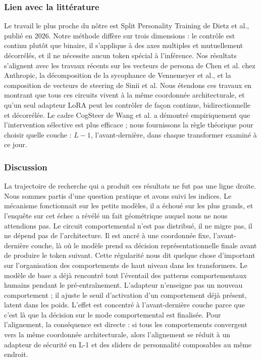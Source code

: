 \documentclass[11pt,a4paper]{article}
\begin{document}
\subsubsection{Lien avec la littérature}

Le travail le plus proche du nôtre est Split Personality Training de Dietz et al., publié en 2026. Notre méthode diffère sur trois dimensions : le contrôle est continu plutôt que binaire, il s'applique à des axes multiples et mutuellement décorrélés, et il ne nécessite aucun token spécial à l'inférence. Nos résultats s'alignent avec les travaux récents sur les vecteurs de persona de Chen et al. chez Anthropic, la décomposition de la sycophance de Vennemeyer et al., et la composition de vecteurs de steering de Sinii et al. Nous étendons ces travaux en montrant que tous ces circuits vivent à la même coordonnée architecturale, et qu'un seul adapteur LoRA peut les contrôler de façon continue, bidirectionnelle et décorrélée. Le cadre CogSteer de Wang et al. a démontré empiriquement que l'intervention sélective est plus efficace ; nous fournissons la règle théorique pour choisir quelle couche : $L-1$, l'avant-dernière, dans chaque transformer examiné à ce jour.

\subsubsection{Discussion}

La trajectoire de recherche qui a produit ces résultats ne fut pas une ligne droite. Nous sommes partis d'une question pratique et avons suivi les indices. Le mécanisme fonctionnait sur les petits modèles, il a échoué sur les plus grands, et l'enquête sur cet échec a révélé un fait géométrique auquel nous ne nous attendions pas. Le circuit comportemental n'est pas distribué, il ne migre pas, il ne dépend pas de l'architecture. Il est ancré à une coordonnée fixe, l'avant-dernière couche, là où le modèle prend sa décision représentationnelle finale avant de produire le token suivant. Cette régularité nous dit quelque chose d'important sur l'organisation des comportements de haut niveau dans les transformers. Le modèle de base a déjà rencontré tout l'éventail des patterns comportementaux humains pendant le pré-entraînement. L'adapteur n'enseigne pas un nouveau comportement ; il ajuste le seuil d'activation d'un comportement déjà présent, latent dans les poids. L'effet est concentré à l'avant-dernière couche parce que c'est là que la décision sur le mode comportemental est finalisée. Pour l'alignement, la conséquence est directe : si tous les comportements convergent vers la même coordonnée architecturale, alors l'alignement se réduit à un adapteur de sécurité en L-1 et des sliders de personnalité composables au même endroit.
\end{document}
